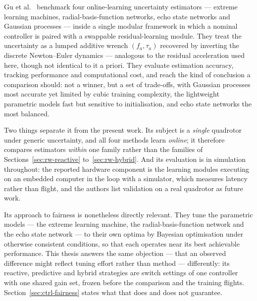 Gu et al.~\cite{gu2025comparative} benchmark four online-learning uncertainty estimators ---
extreme learning machines, radial-basis-function networks, echo state networks and Gaussian
processes --- inside a single modular framework in which a nominal controller is paired with a
swappable residual-learning module. They treat the uncertainty as a lumped additive wrench
\((f_a, \tau_a)\) recovered by inverting the discrete Newton--Euler dynamics --- analogous to the
residual acceleration used here, though not identical to it a priori. They evaluate estimation accuracy, tracking
performance and computational cost, and reach the kind of conclusion a comparison should: not a
winner, but a set of trade-offs, with Gaussian processes most accurate yet limited by cubic
training complexity, the lightweight parametric models fast but sensitive to initialisation, and
echo state networks the most balanced.

Two things separate it from the present work. Its subject is a \emph{single} quadrotor under
generic uncertainty, and all four methods learn \emph{online}; it therefore compares estimators
\emph{within} one family rather than the families of Sections~\ref{sec:rw-reactive}
to~\ref{sec:rw-hybrid}. And its evaluation is in simulation throughout: the reported hardware
component is the learning modules executing on an embedded computer in the loop with a simulator,
which measures latency rather than flight, and the authors list validation on a real quadrotor as
future work.

Its approach to fairness is nonetheless directly relevant. They tune the parametric models --- the
extreme learning machine, the radial-basis-function network and the echo state network --- to their
own optima by Bayesian optimisation under otherwise consistent conditions, so that each operates
near its best achievable performance. This thesis answers the same objection --- that an observed
difference might reflect tuning effort rather than method --- differently: its reactive,
predictive and hybrid strategies are switch settings of one controller with one shared gain set,
frozen before the comparison and the training flights. Section~\ref{sec:ctrl-fairness} states what
that does and does not guarantee.

